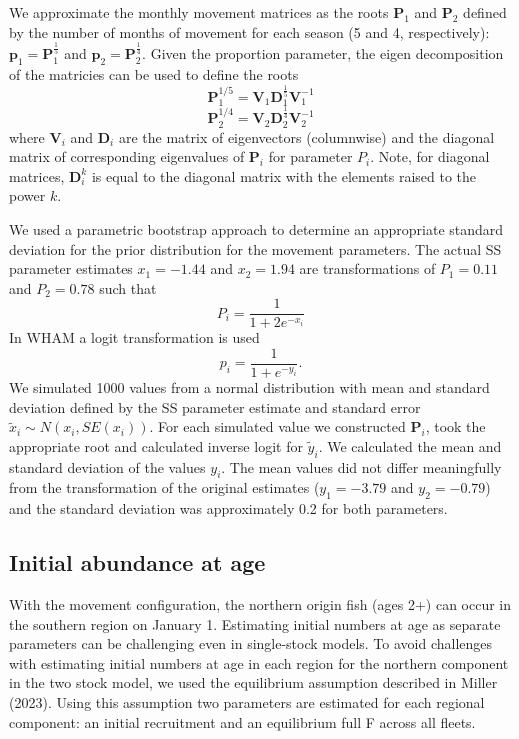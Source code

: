 \documentclass[
]{article}
\begin{document}
We approximate the monthly movement matrices as the roots \(\mathbf{P}_1\) and \(\mathbf{P}_2\) defined by the number of months of movement for each season (5 and 4, respectively): \(\mathbf{p}_1 = \mathbf{P}_1^{\frac{1}{5}}\) and \(\mathbf{p}_2 = \mathbf{P}_2^{\frac{1}{4}}\). Given the proportion parameter, the eigen decomposition of the matricies can be used to define the roots
\[  \mathbf{P}_1^{1/5} = \mathbf{V}_1 \mathbf{D}_1^{\frac{1}{5}} \mathbf{V}_1^{-1}\]
\[  \mathbf{P}_2^{1/4} = \mathbf{V}_2 \mathbf{D}_2^{\frac{1}{4}} \mathbf{V}_2^{-1}\]
where \(\mathbf{V}_i\) and \(\mathbf{D}_i\) are the matrix of eigenvectors (columnwise) and the diagonal matrix of corresponding eigenvalues of \(\mathbf{P}_i\) for parameter \(P_i\). Note, for diagonal matrices, \(\mathbf{D}_i^k\) is equal to the diagonal matrix with the elements raised to the power \(k\).

We used a parametric bootstrap approach to determine an appropriate standard deviation for the prior distribution for the movement parameters.
The actual SS parameter estimates \(x_1=-1.44\) and \(x_2=1.94\) are transformations of \(P_1=0.11\) and \(P_2=0.78\) such that
\[
P_i = \frac{1}{1 + 2e^{-x_i}}
\]
In WHAM a logit transformation is used
\[
p_i = \frac{1}{1+e^{-y_i}}.
\]
We simulated 1000 values from a normal distribution with mean and standard deviation defined by the SS parameter estimate and standard error \(\tilde x_i \sim N(x_i, SE(x_i))\). For each simulated value we constructed \(\mathbf{P}_i\), took the appropriate root and calculated inverse logit for \(\tilde y_i\). We calculated the mean and standard deviation of the values \(y_i\). The mean values did not differ meaningfully from the transformation of the original estimates (\(y_1 = -3.79\) and \(y_2 = -0.79\)) and the standard deviation was approximately 0.2 for both parameters.

\hypertarget{initial-abundance-at-age}{%
\subsection{Initial abundance at age}\label{initial-abundance-at-age}}

With the movement configuration, the northern origin fish (ages 2+) can occur in the southern region on January 1. Estimating initial numbers at age as separate parameters can be challenging even in single-stock models. To avoid challenges with estimating initial numbers at age in each region for the northern component in the two stock model, we used the equilibrium assumption described in Miller (2023). Using this assumption two parameters are estimated for each regional component: an initial recruitment and an equilibrium full F across all fleets.
\end{document}
